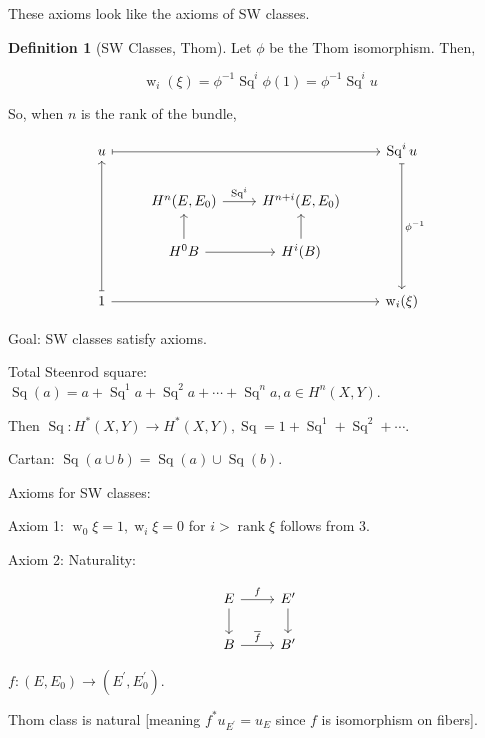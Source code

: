 \documentclass{article}
\theoremstyle{definition}
\newtheorem*{definition}{Definition}
\begin{document}
    These axioms look like the axioms of SW classes.

    \begin{definition}
        [SW Classes, Thom]

        Let \(\phi\) be the Thom isomorphism. Then,

        \[
            \operatorname{w}_i(\xi) = \phi ^{-1} \operatorname{Sq}^i \phi (1) = \phi ^{-1} \operatorname{Sq}^i u
        \]
    \end{definition}

    So, when \(n\) is the rank of the bundle,

    \[
        \begin{tikzcd}
            u \ar[rrr, mapsto] & & & \operatorname{Sq}^i u \ar[ddd, mapsto, "\phi^{-1}"] \\ & H^n(E,E_0) \ar[r,"\operatorname{Sq}^i"] & H^{n+i} (E,E_0) \\ & H^0 B \ar[u] \ar[r] & H^i(B) \ar[u] \\ 1 \ar[uuu, mapsto] \ar[rrr] & & & \operatorname{w}_i(\xi)
        \end{tikzcd}
    \]

    Goal: SW classes satisfy axioms.

    Total Steenrod square: \(\operatorname{Sq}(a) = a + \operatorname{Sq}^1 a + \operatorname{Sq}^2 a + \cdots + \operatorname{Sq}^n a, a \in H^n(X,Y)\).

    Then \(\operatorname{Sq}: H^{\ast} (X,Y) \to H^{\ast} (X,Y), \operatorname{Sq} = 1 + \operatorname{Sq}^1 + \operatorname{Sq}^2 + \cdots\).

    Cartan: \(\operatorname{Sq}(a\cup b) = \operatorname{Sq}(a) \cup \operatorname{Sq}(b)\). 

    Axioms for SW classes:

    Axiom 1: \(\operatorname{w}_0 \xi = 1, \operatorname{w}_i \xi = 0\) for \(i > \operatorname{rank} \xi\) follows from 3.

    Axiom 2: Naturality:

    \[
        \begin{tikzcd}
            E \ar[r,"f"] \ar[d] & E^{\prime} \ar[d] \\ B \ar[r,"\overline{f}"] & B^{\prime}
        \end{tikzcd}
    \]

    \(f: (E,E_0) \to (E^{\prime} , E_0^{\prime})\).

    Thom class is natural [meaning \(f^{\ast} u_{E^{\prime}} = u_E\) since \(f\) is isomorphism on fibers].
\end{document}
